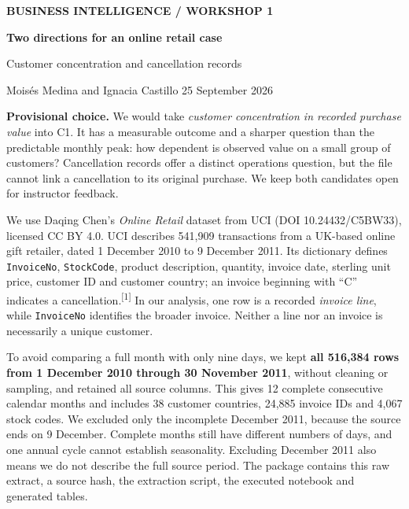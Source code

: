 \documentclass[10pt,a4paper]{article}
\newcommand{\sectionhead}[1]{\vspace{0.34em}{\large\bfseries\color{navy}#1}\par\vspace{0.08em}}
\newcommand{\source}[1]{\textsuperscript{[#1]}}
\begin{document}
\thispagestyle{empty}
{\small\bfseries\color{navy} BUSINESS INTELLIGENCE \hspace{0.7em} / \hspace{0.7em} WORKSHOP 1}\par
\vspace{0.6em}
{\LARGE\bfseries Two directions for an online retail case}\par
\vspace{0.35em}
{\large Customer concentration and cancellation records}\par
\vspace{0.55em}
{\color{muted} Mois\'{e}s Medina \quad and \quad Ignacia Castillo \hfill 25 September 2026}\par
{}\vspace{0.55em}

\textbf{Provisional choice.} We would take \emph{customer concentration in recorded purchase value} into C1. It has a measurable outcome and a sharper question than the predictable monthly peak: how dependent is observed value on a small group of customers? Cancellation records offer a distinct operations question, but the file cannot link a cancellation to its original purchase. We keep both candidates open for instructor feedback.

\sectionhead{1\quad Source, scope and observation unit}
We use Daqing Chen's \emph{Online Retail} dataset from UCI (DOI 10.24432/C5BW33), licensed CC BY 4.0. UCI describes 541,909 transactions from a UK-based online gift retailer, dated 1 December 2010 to 9 December 2011. Its dictionary defines \texttt{InvoiceNo}, \texttt{StockCode}, product description, quantity, invoice date, sterling unit price, customer ID and customer country; an invoice beginning with ``C'' indicates a cancellation.\source{1} In our analysis, one row is a recorded \emph{invoice line}, while \texttt{InvoiceNo} identifies the broader invoice. Neither a line nor an invoice is necessarily a unique customer.

To avoid comparing a full month with only nine days, we kept \textbf{all 516,384 rows from 1 December 2010 through 30 November 2011}, without cleaning or sampling, and retained all source columns. This gives 12 complete consecutive calendar months and includes 38 customer countries, 24,885 invoice IDs and 4,067 stock codes. We excluded only the incomplete December 2011, because the source ends on 9 December. Complete months still have different numbers of days, and one annual cycle cannot establish seasonality. Excluding December 2011 also means we do not describe the full source period. The package contains this raw extract, a source hash, the extraction script, the executed notebook and generated tables.
\end{document}
